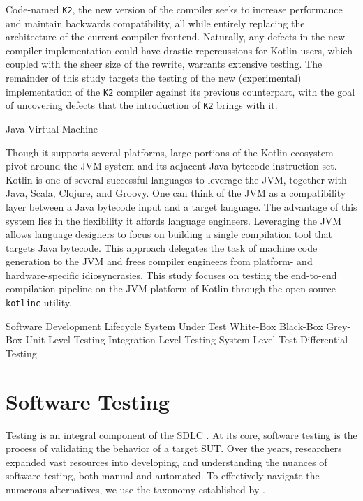 Code-named \texttt{K2}, the new version of the compiler seeks
to increase performance and maintain backwards compatibility,
all while entirely replacing the architecture of the current compiler frontend.
Naturally, any defects in the new compiler implementation
could have drastic repercussions for Kotlin users, which coupled with the
sheer size of the rewrite, warrants extensive testing.
The remainder of this study targets the testing of the new
(experimental) implementation of the \texttt{K2} compiler
against its previous counterpart, with the goal
of uncovering defects that the introduction of \texttt{K2} brings with it.

 {Java Virtual Machine}

Though it supports several platforms, large portions of the Kotlin ecosystem pivot around
the \Gls{JVM} system and its adjacent Java bytecode instruction set.
Kotlin is one of several successful languages to leverage the \gls{JVM},
together with Java, Scala, Clojure, and Groovy. 
One can think of the \gls{JVM} as a compatibility layer
between a Java bytecode input and a target language.
The advantage of this system lies in the flexibility it affords
language engineers.
Leveraging the \gls{JVM} allows
language designers to focus on building a single compilation tool
that targets Java bytecode.
This approach delegates the task of machine code
generation to the \gls{JVM} and frees compiler engineers from
platform- and hardware-specific idiosyncrasies.
This study focuses on testing the end-to-end compilation pipeline
on the \gls{JVM} platform
of Kotlin through the open-source \texttt{kotlinc} utility.

 {Software Development Lifecycle}
 {System Under Test}
 {White-Box}
 {Black-Box}
 {Grey-Box}
 {Unit-Level Testing}
 {Integration-Level Testing}
 {System-Level Test}
 {Differential Testing}

\section{Software Testing}

Testing is an integral component of the \gls{SDLC} \cite{jamil2016software}.
At its core, software testing is the process of validating
the behavior of a target \gls{SUT}. 
Over the years, researchers expanded vast resources into
developing, and understanding the nuances of
software testing, both manual and automated.
To effectively navigate the numerous alternatives, we use the
taxonomy established by \citet{umar2020comprehensive}.

